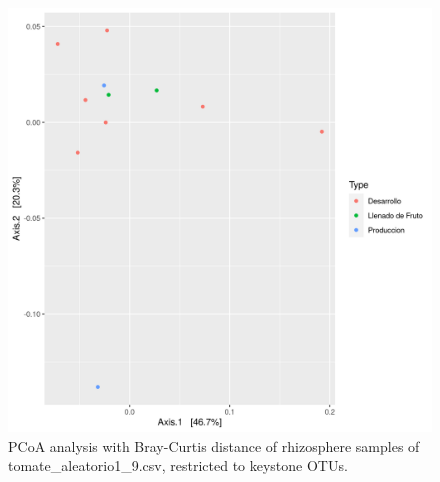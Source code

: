 \begin{figure}
  \centering
  \includegraphics[scale = 0.7]{pcoa_key_otus_tomate_aleatorio1_9.csv.png}
  \caption{PCoA analysis with Bray-Curtis distance of rhizosphere samples of tomate_aleatorio1_9.csv, restricted to keystone OTUs.}
  \label{fig:tomate_aleatorio1_9.csv_pcoa_key_otus}
\end{figure}
